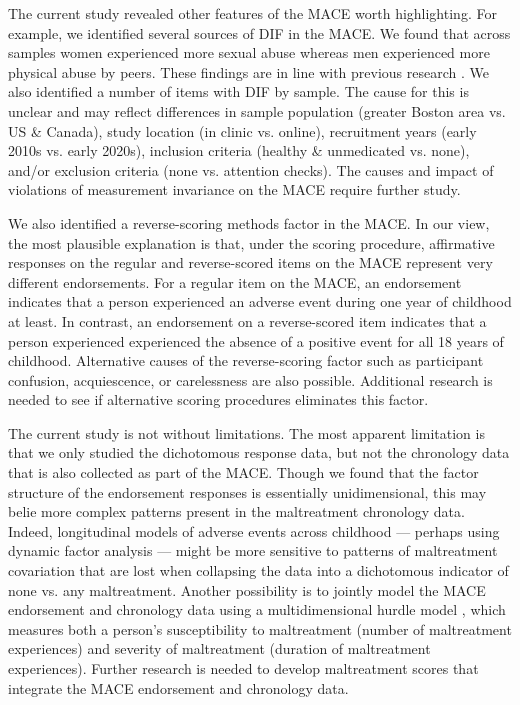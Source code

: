 \documentclass[letterpaper,man,natbib,floatsintext,longtable]{apa6}
\begin{document}
The current study revealed other features of the MACE worth highlighting. For example, we identified several sources of DIF in the MACE. We found that across samples women experienced more sexual abuse whereas men experienced more physical abuse by peers. These findings are in line with previous research \citep{radford2013prevalence}. We also identified a number of items with DIF by sample. The cause for this is unclear and may reflect differences in sample population (greater Boston area vs. US \& Canada), study location (in clinic vs. online), recruitment years (early 2010s vs. early 2020s), inclusion criteria (healthy \& unmedicated vs. none), and/or exclusion criteria (none vs. attention checks). The causes and impact of violations of measurement invariance on the MACE require further study. 

We also identified a reverse-scoring methods factor in the MACE. In our view, the most plausible explanation is that, under the \cite{teicher2015maltreatment} scoring procedure, affirmative responses on the regular and reverse-scored items on the MACE represent very different endorsements. For a regular item on the MACE, an endorsement indicates that a person experienced an adverse event during one year of childhood at least. In contrast, an endorsement on a reverse-scored item indicates that a person experienced experienced the absence of a positive event for all 18 years of childhood. Alternative causes of the reverse-scoring factor such as participant confusion, acquiescence, or carelessness \citep{weijters2013reversed} are also possible. Additional research is needed to see if alternative scoring procedures eliminates this factor. 

The current study is not without limitations. The most apparent limitation is that we only studied the dichotomous response data, but not the chronology data that is also collected as part of the MACE. Though we found that the factor structure of the endorsement responses is essentially unidimensional, this may belie more complex patterns present in the maltreatment chronology data. Indeed, longitudinal models of adverse events across childhood --- perhaps using dynamic factor analysis \citep{zhang2007bayesian} --- might be more sensitive to patterns of maltreatment covariation that are lost when collapsing the data into a dichotomous indicator of none vs. any maltreatment. Another possibility is to jointly model the MACE endorsement and chronology data using a multidimensional hurdle model \citep{magnus2021symptom}, which measures both a person's susceptibility to maltreatment (number of maltreatment experiences) and severity of maltreatment (duration of maltreatment experiences). Further research is needed to develop maltreatment scores that integrate the MACE endorsement and chronology data. 
\end{document}
